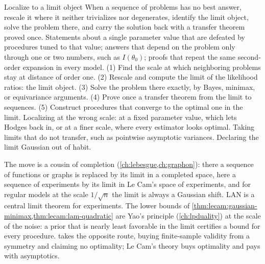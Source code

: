 \begin{refsection}
\begin{move}{Localize to a limit object}
 When a sequence of problems has no best answer, rescale it where it neither trivializes nor degenerates, identify the limit object, solve the problem there, and carry the solution back with a transfer theorem proved once.
 Statements about a single parameter value that are defeated by procedures tuned to that value; answers that depend on the problem only through one or two numbers, such as $I(\theta_0)$; proofs that repeat the same second-order expansion in every model.
 (1) Find the scale at which neighboring problems stay at distance of order one. (2) Rescale and compute the limit of the likelihood ratios: the limit object. (3) Solve the problem there exactly, by Bayes, minimax, or equivariance arguments. (4) Prove once a transfer theorem from the limit to sequences. (5) Construct procedures that converge to the optimal one in the limit.
 Localizing at the wrong scale: at a fixed parameter value, which lets Hodges back in, or at a finer scale, where every estimator looks optimal. Taking limits that do not transfer, such as pointwise asymptotic variances. Declaring the limit Gaussian out of habit.
\end{move}


The move is a cousin of completion (\cref{ch:lebesgue,ch:graphon}): there a sequence of functions or graphs is replaced by its limit in a completed space, here a sequence of experiments by its limit in Le Cam's space of experiments, and for regular models at the scale $1/\sqrt n$ the limit is always a Gaussian shift. LAN is a central limit theorem for experiments. The lower bounds of \cref{thm:lecam:gaussian-minimax,thm:lecam:lam-quadratic} are Yao's principle (\cref{ch:lpduality}) at the scale of the noise: a prior that is nearly least favorable in the limit certifies a bound for every procedure.  takes the opposite route, buying finite-sample validity from a symmetry and claiming no optimality; Le Cam's theory buys optimality and pays with asymptotics.


\end{refsection}
